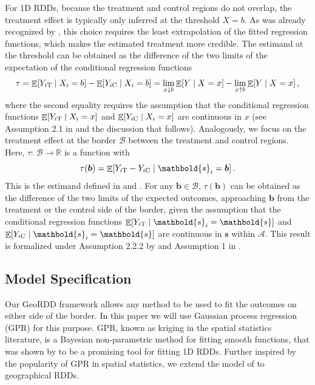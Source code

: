 \documentclass[letter]{article}
\DeclarePairedDelimiter{\squarebracket}{\lbrack}{\rbrack}
\newcommand{\sbr}[1]{\squarebracket*{#1}}
\DeclareMathOperator{\E}{\mathbb{E}}
\newcommand{\area}{\mathcal{A}}
\newcommand{\treat}{\mathrm{T}}
\newcommand{\ctrol}{\mathrm{C}}
\newcommand{\svec}{\mathbold{s}}
\newcommand{\border}{\mathcal{B}}
\newcommand{\sentinel}{\bm{b}}
\newcommand{\eqlabel}[1]{\label{#1}}
\renewcommand{\cite}[1]{\citet{#1}}
\begin{document}
    	For 1D RDDs, because the treatment and control regions do not overlap, the treatment effect is typically only inferred at the threshold \(X=b\).
As was already recognized by \cite{thistlethwaite1960regression}, this choice requires the least extrapolation of the fitted regression functions, which makes the estimated treatment more credible.
The estimand at the threshold can be obtained as the difference of the two limits of the expectation of the conditional regression functions
\begin{equation}
\eqlabel{eq:rdd_univ_estimand}
\tau = \E\sbr{Y_{i\treat} \mid X_i=b} - \E\sbr{Y_{i\ctrol} \mid X_i=b} = \lim_{x \downarrow b} \E\sbr{Y \mid X=x} - \lim_{x \uparrow b} \E\sbr{Y \mid X=x}\,,
\end{equation}
where the second equality requires the assumption that the conditional regression functions \(\E\sbr{Y_{i\treat} \mid X_i=x}\) and \(\E\sbr{Y_{i\ctrol} \mid X_i=x}\) are continuous in \(x\) (see Assumption 2.1 in \cite{imbensrdd} and the discussion that follows).
Analogously, we focus on the treatment effect at the border \(\border\) between the treatment and control regions.
Here, \(\tau:\,\border \rightarrow \mathbb{R}\) is a function with
\begin{equation}
    \tau(\sentinel) =  \E\sbr{Y_{i\treat} - Y_{i\ctrol} \mid \svec_i = \sentinel} \,.
\eqlabel{eq:functional_estimand}
\end{equation}
This is the estimand defined in \cite{imbens2011regression} and \cite{keele_titiunik_2015}.
For any \(\sentinel \in \border\), \(\tau(\sentinel)\) can be obtained as the difference of the two limits of the expected outcomes, approaching \(\sentinel\) from the treatment or the control side of the border, given the assumption that the conditional regression functions \(\E\sbr{Y_{i\treat} \mid \svec_i=\svec}\) and \(\E\sbr{Y_{i\ctrol} \mid \svec_i=\svec}\) are continuous in \(\svec\) within \(\area\).
This result is formalized under Assumption 2.2.2 by \cite{imbens2011regression} and Assumption 1 in \cite{keele_titiunik_2015}.
    


    	\hypertarget{model-specification}{%
\subsection{Model Specification}\label{model-specification}}
    

\label{sec:twogp}
    	Our GeoRDD framework allows any method to be used to fit the outcomes on either side of the border.
In this paper we will use Gaussian process regression (GPR) for this purpose.
GPR, known as kriging in the spatial statistics literature, is a Bayesian non-parametric method for fitting smooth functions, that was shown by \cite{Branson:2017qy} to be a promising tool for fitting 1D RDDs.
Further inspired by the popularity of GPR in spatial statistics, we extend the model of \cite{Branson:2017qy} to geographical RDDs.
\end{document}

